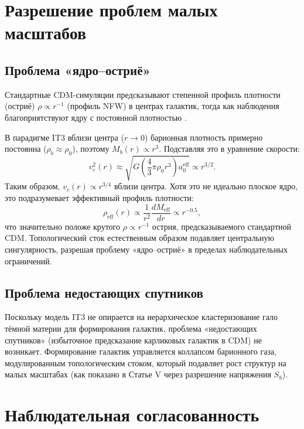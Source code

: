 \documentclass[12pt,a4paper]{article}
\begin{document}
\section{Разрешение проблем малых масштабов}

\subsection{Проблема «ядро–остриё»}

Стандартные CDM-симуляции предсказывают степенной профиль плотности (остриё) $\rho \propto r^{-1}$ (профиль NFW) в центрах галактик, тогда как наблюдения благоприятствуют ядру с постоянной плотностью \citep{Moore1994}.

В парадигме IT3 вблизи центра ($r \to 0$) барионная плотность примерно постоянна ($\rho_b \approx \rho_0$), поэтому $M_b(r) \propto r^3$. Подставляя это в уравнение скорости:
\begin{equation}
v_c^2(r) \approx \sqrt{G \left(\frac{4}{3}\pi \rho_0 r^3\right) a_0^{\mathrm{eff}}} \propto r^{3/2}.
\end{equation}
Таким образом, $v_c(r) \propto r^{3/4}$ вблизи центра. Хотя это не идеально плоское ядро, это подразумевает эффективный профиль плотности:
\begin{equation}
\rho_{\mathrm{eff}}(r) \propto \frac{1}{r^2} \frac{dM_{\mathrm{eff}}}{dr} \propto r^{-0.5},
\end{equation}
что значительно положе крутого $\rho \propto r^{-1}$ острия, предсказываемого стандартной CDM. Топологический сток естественным образом подавляет центральную сингулярность, разрешая проблему «ядро–остриё» в пределах наблюдательных ограничений.

\subsection{Проблема недостающих спутников}

Поскольку модель IT3 не опирается на иерархическое кластеризование гало тёмной материи для формирования галактик, проблема «недостающих спутников» (избыточное предсказание карликовых галактик в CDM) не возникает. Формирование галактик управляется коллапсом барионного газа, модулированным топологическим стоком, который подавляет рост структур на малых масштабах (как показано в Статье V через разрешение напряжения $S_8$).

\section{Наблюдательная согласованность}
\end{document}
